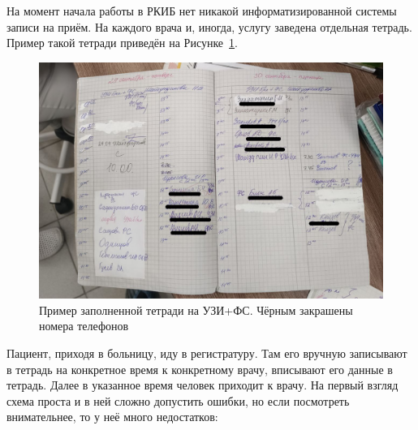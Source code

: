 \documentclass[a4paper,article]{article}
\begin{document}
\begin{sloppypar}
        На момент начала работы в РКИБ нет никакой информатизированной системы записи на приём. На каждого врача и, иногда, услугу заведена отдельная тетрадь. Пример такой тетради приведён на Рисунке~\ref{fig:Тетрадь на УЗИ+ФС}.

        \begin{figure}[h]

            \centering

            \includegraphics[width=0.8\linewidth]{Пример заполненной тетради на УЗИ+ФС. Чёрным закрашены номера телефонов.png}

            \caption{\centering Пример заполненной тетради на УЗИ+ФС. Чёрным закрашены номера телефонов}

            \label{fig:Тетрадь на УЗИ+ФС}

        \end{figure}

        Пациент, приходя в больницу, иду в регистратуру. Там его вручную записывают в тетрадь на конкретное время к конкретному врачу, вписывают его данные в тетрадь. Далее в указанное время человек приходит к врачу.
        На первый взгляд схема проста и в ней сложно допустить ошибки, но если посмотреть внимательнее, то у неё много недостатков:


\end{sloppypar}
\end{document}
